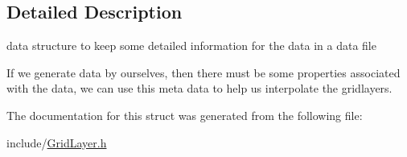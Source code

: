\subsection{\-Detailed \-Description}
data structure to keep some detailed information for the data in a data file 

\-If we generate data by ourselves, then there must be some properties associated with the data, we can use this meta data to help us interpolate the gridlayers. 

\-The documentation for this struct was generated from the following file\-:\begin{DoxyCompactItemize}
\item 
include/\hyperlink{GridLayer_8h}{\-Grid\-Layer.\-h}\end{DoxyCompactItemize}
